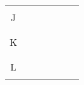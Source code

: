 \documentclass[a4paper, 10pt, twocolumn, landscape]{article}
\begin{document}
\begin{table}[ht]
{\begin{tabular}{|c|c|c|c|m{80mm}|m{120mm}|c|}
          & & & & & &\\
        \hline
          & & & & & &\\
        J & & & & & &\\
          & & & & & &\\
        \hline
          & & & & & &\\
        K & & & & & &\\
          & & & & & &\\
        \hline
          & & & & & &\\
        L & & & & & &\\
          & & & & & &\\
        \hline
      \end{tabular}
    }
  \end{table}
\end{document}
